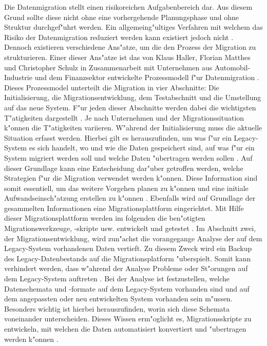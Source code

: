 Die Datenmigration stellt einen risikoreichen Aufgabenbereich dar. Aus diesem Grund sollte diese nicht ohne eine vorhergehende Planungsphase und ohne Struktur durchgef"uhrt werden. Ein allgemeing"ultiges Verfahren mit welchem das Risiko der Datenmigration reduziert werden kann existiert jedoch nicht \citep[S.~3]{wuLawless-1997}. Dennoch existieren verschiedene Ans"atze, um die den Prozess der Migration zu strukturieren. Einer dieser Ans"atze ist das von Klaus Haller, Florian Matthes und Christopher Schulz in Zusammenarbeit mit Unternehmen aus Automobil-Industrie und dem Finanzsektor entwickelte Prozessmodell f"ur Datenmigration \citep[S.~2f.]{klausMatthesSchulz-2012}. 
\lb
Dieses Prozessmodel unterteilt die Migration in vier Abschnitte: Die Initialisierung, die Migrationsentwicklung, dem Testabschnitt und die Umstellung auf das neue System. F"ur jeden dieser Abschnitte werden dabei die wichtigsten T"atigkeiten dargestellt \citep[S.~5f]{klausMatthesSchulz-2012}. Je nach Unternehmen und der Migrationssituation k"onnen die T"atigkeiten variieren.
\lb
W"ahrend der Initialisierung muss die aktuelle Situation erfasst werden. Hierbei gilt es herauszufinden, um was f"ur ein Legacy-System es sich handelt, wo und wie die Daten gespeichert sind, auf was f"ur ein System migriert werden soll und welche Daten "ubertragen werden sollen \citep[S.~7]{klausMatthesSchulz-2012}. Auf dieser Grundlage kann eine Entscheidung dar"uber getroffen werden, welche Strategien f"ur die Migration verwendet werden k"onnen. Diese Information sind somit essentiell, um das weitere Vorgehen planen zu k"onnen und eine initiale Aufwandseinsch"atzung erstellen zu k"onnen \citep[S.~7]{klausMatthesSchulz-2012}. Ebenfalls wird auf Grundlage der gesammelten Informationen eine Migrationsplattform eingerichtet. Mit Hilfe dieser Migrationsplattform werden im folgenden die ben"otigten Migrationswerkzeuge, -skripte usw. entwickelt und getestet \citep[S.~7]{klausMatthesSchulz-2012}.
\lb
Im Abschnitt zwei, der Migrationsentwicklung, wird zun"achst die vorangegange Analyse der auf dem Legacy-System vorhandenen Daten vertieft. Zu diesem Zweck wird ein Backup des Legacy-Datenbestands auf die Migrationsplatform "uberspielt. Somit kann verhindert werden, dass w"ahrend der Analyse Probleme oder St"orungen auf dem Legacy-System auftreten \citep[S.~7]{klausMatthesSchulz-2012}. Bei der Analyse ist festzustellen, welche Datenschemata und -formate auf dem Legacy-System vorhanden sind und auf dem angepassten oder neu entwickelten System vorhanden sein m"ussen. Besonders wichtig ist hierbei herauszufinden, worin sich diese Schemata voneinander unterscheiden. Dieses Wissen erm"oglicht es, Migrationsskripte zu entwickeln, mit welchen die Daten automatisiert konvertiert und "ubertragen werden k"onnen \citep[S.~7f.]{klausMatthesSchulz-2012}. 

